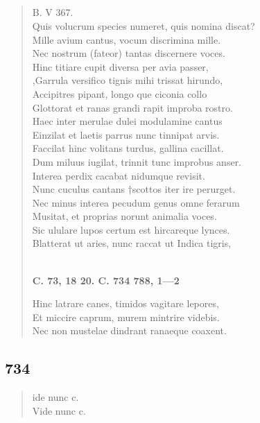 \documentclass[11pt, a4paper]{report}
\begin{document}
            \subsection*{}
      \begin{verse}
      B. V 367. \\ Quis volucrum species numeret, quis nomina discat? \\ Mille avium cantus, vocum discrimina mille. \\ Nec nostrum (fateor) tantas discernere voces. \\ Hinc titiare cupit diversa per avia passer, \\ ,Garrula versifico tignis mihi trissat hirundo, \\  \lbrack Accipitres pipant, longo \lbrack que \rbrack  ciconia collo \\ Glottorat et ranas grandi rapit improba rostro. \\ Haec inter merulae dulei modulamine cantus \\ Einzilat et laetis parrus nunc tinnipat arvis. \\ Faccilat hinc volitans turdus, gallina cacillat. \\ Dum miluus iugilat, trinnit tunc improbus anser. \\ Interea perdix cacabat nidumque revisit. \\ Nunc cuculus cantans †scottos iter ire perurget. \\ Nec minus interea pecudum genus omne ferarum \\ Musitat, et proprias norunt animalia voces. \\ Sic ululare lupos certum est hircareque lynces. \\ Blatterat ut aries, nunc raccat ut Indica tigris, \\ 
        ﻿\pagebreak 
    \begin{center} \textbf{C. 73, 18 20. C. 734 788, 1—2} \end{center} \marginpar{[219]} Hinc latrare canes, timidos vagitare lepores, \\ Et miccire caprum, murem mintrire videbis. \\ Nec non mustelae dindrant ranaeque coaxent. \\ 
      \end{verse}
  
            \subsection*{734}
      \begin{verse}
      ide nunc c. \\ Vide nunc c. \\ 
      \end{verse}
  
\end{document}

